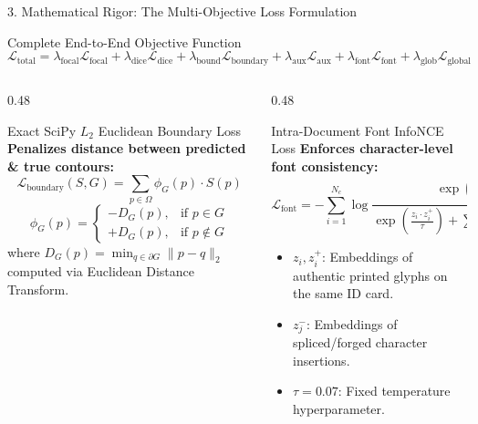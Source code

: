 \documentclass[aspectratio=169, 10pt]{beamer}
\begin{document}
\begin{frame}{3. Mathematical Rigor: The Multi-Objective Loss Formulation}
  \begin{crispbox}{Complete End-to-End Objective Function}
    \vspace{-1mm}
    $$\mathcal{L}_{\text{total}} = \lambda_{\text{focal}} \mathcal{L}_{\text{focal}} + \lambda_{\text{dice}} \mathcal{L}_{\text{dice}} + \lambda_{\text{bound}} \mathcal{L}_{\text{boundary}} + \lambda_{\text{aux}} \mathcal{L}_{\text{aux}} + \lambda_{\text{font}} \mathcal{L}_{\text{font}} + \lambda_{\text{glob}} \mathcal{L}_{\text{global}}$$
  \end{crispbox}

  \begin{columns}[T]
    \begin{column}{0.48\textwidth}
      \begin{crispbox}{Exact SciPy $L_2$ Euclidean Boundary Loss}
        \textbf{Penalizes distance between predicted \& true contours:}
        $$\mathcal{L}_{\text{boundary}}(S, G) = \sum_{p \in \Omega} \phi_G(p) \cdot S(p)$$
        $$\phi_G(p) = \begin{cases} -D_G(p), & \text{if } p \in G \\ +D_G(p), & \text{if } p \notin G \end{cases}$$
        where $D_G(p) = \min_{q \in \partial G} \|p - q\|_2$ computed via Euclidean Distance Transform.
      \end{crispbox}
    \end{column}

    \begin{column}{0.48\textwidth}
      \begin{crispbox}{Intra-Document Font InfoNCE Loss}
        \textbf{Enforces character-level font consistency:}
        $$\mathcal{L}_{\text{font}} = -\sum_{i=1}^{N_c} \log \frac{\exp\left(\frac{z_i \cdot z_i^+}{\tau}\right)}{\exp\left(\frac{z_i \cdot z_i^+}{\tau}\right) + \sum_{j=1}^{K} \exp\left(\frac{z_i \cdot z_j^-}{\tau}\right)}$$
        \begin{itemize}\scriptsize
          \item $z_i, z_i^+$: Embeddings of authentic printed glyphs on the same ID card.
          \item $z_j^-$: Embeddings of spliced/forged character insertions.
          \item $\tau = 0.07$: Fixed temperature hyperparameter.
        \end{itemize}
      \end{crispbox}
    \end{column}
  \end{columns}
\end{frame}
\end{document}
